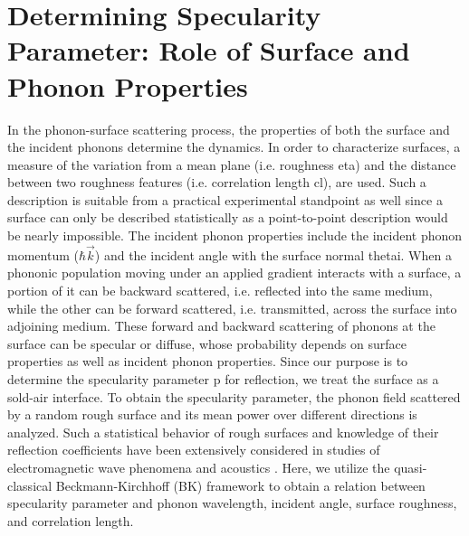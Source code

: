 \section{Determining Specularity Parameter: Role of Surface and Phonon Properties}\label{sec:BK}
In the phonon-surface scattering process, the properties of both the surface and the incident phonons determine the dynamics. In order to characterize surfaces, a measure of the variation from a mean plane (i.e. roughness \gls{eta}) and the distance between two roughness features (i.e. correlation length 
\gls{cl}), are used. Such a description is suitable from a practical experimental standpoint as well since a surface can only be described statistically as a point-to-point description would be nearly impossible. The incident phonon properties include the incident phonon momentum ($\hbar\vec{k}$) and the incident angle with the surface normal \gls{thetai}. When a phononic population moving under an applied gradient interacts with a surface, a portion of it can be backward scattered, i.e. reflected into the same medium, while the other can be forward scattered, i.e. transmitted, across the surface into adjoining medium. These forward and backward scattering of phonons at the surface can be specular or diffuse, whose probability depends on surface properties as well as incident phonon properties. Since our purpose is to determine the specularity parameter \gls{p} for reflection, we treat the surface as a sold-air interface. To obtain the specularity parameter, the phonon field scattered by a random rough surface and its mean power over different directions is analyzed. Such a statistical behavior of rough surfaces and knowledge of their reflection coefficients have been extensively considered in studies of electromagnetic wave phenomena and acoustics \cite{RN101,book_Beckmann}. Here, we utilize the quasi-classical Beckmann-Kirchhoff (BK) framework to obtain a relation between specularity parameter and phonon wavelength, incident angle, surface roughness, and correlation length. 
